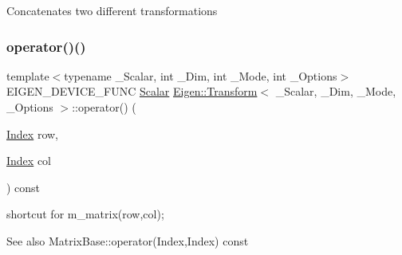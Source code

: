Concatenates two different transformations \mbox{\label{class_eigen_1_1_transform_aa0a930a85c51566fe06d281da85d1a4a}} 
\subsubsection{\texorpdfstring{operator()()}{operator()()}\hspace{0.1cm}{\footnotesize\ttfamily [1/2]}}
{\footnotesize\ttfamily template$<$typename \+\_\+\+Scalar, int \+\_\+\+Dim, int \+\_\+\+Mode, int \+\_\+\+Options$>$ \\
E\+I\+G\+E\+N\+\_\+\+D\+E\+V\+I\+C\+E\+\_\+\+F\+U\+NC \mbox{\hyperlink{class_eigen_1_1_transform_a4e69ced9d651745b8ed4eda46f41795d}{Scalar}} \mbox{\hyperlink{class_eigen_1_1_transform}{Eigen\+::\+Transform}}$<$ \+\_\+\+Scalar, \+\_\+\+Dim, \+\_\+\+Mode, \+\_\+\+Options $>$\+::operator() (\begin{DoxyParamCaption}\item[{\mbox{\hyperlink{class_eigen_1_1_transform_a49df3689ac2b736bcb564dec47d6486c}{Index}}}]{row,  }\item[{\mbox{\hyperlink{class_eigen_1_1_transform_a49df3689ac2b736bcb564dec47d6486c}{Index}}}]{col }\end{DoxyParamCaption}) const\hspace{0.3cm}{\ttfamily [inline]}}

shortcut for m\+\_\+matrix(row,col); \begin{DoxySeeAlso}{See also}
Matrix\+Base\+::operator(\+Index,\+Index) const  
\end{DoxySeeAlso}
\mbox{\label{class_eigen_1_1_transform_ab66b426ef3ebf955d4f925cbcee34293}} 
